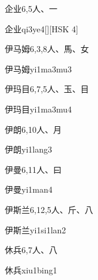 \begin{entry}{企业}{6,5}{⼈、⼀}
  \begin{phonetics}{企业}{qi3ye4}[][HSK 4]
  \end{phonetics}
\end{entry}

\begin{entry}{伊马姆}{6,3,8}{⼈、⾺、⼥}
  \begin{phonetics}{伊马姆}{yi1ma3mu3}
  \end{phonetics}
\end{entry}

\begin{entry}{伊玛目}{6,7,5}{⼈、⽟、⽬}
  \begin{phonetics}{伊玛目}{yi1ma3mu4}
  \end{phonetics}
\end{entry}

\begin{entry}{伊朗}{6,10}{⼈、⽉}
  \begin{phonetics}{伊朗}{yi1lang3}
  \end{phonetics}
\end{entry}

\begin{entry}{伊曼}{6,11}{⼈、⽈}
  \begin{phonetics}{伊曼}{yi1man4}
  \end{phonetics}
\end{entry}

\begin{entry}{伊斯兰}{6,12,5}{⼈、⽄、⼋}
  \begin{phonetics}{伊斯兰}{yi1si1lan2}
  \end{phonetics}
\end{entry}

\begin{entry}{休兵}{6,7}{⼈、⼋}
  \begin{phonetics}{休兵}{xiu1bing1}
  \end{phonetics}
\end{entry}

